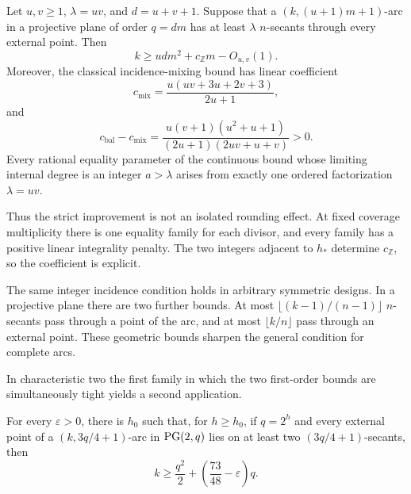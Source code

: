 \begin{theorem}\label{thm:factor-pair}
Let \(u,v\ge1\), \(\lambda=uv\), and \(d=u+v+1\).  Suppose that a
\((k,(u+1)m+1)\)-arc in a projective plane of order \(q=dm\) has at least
\(\lambda\) \(n\)-secants through every external point.  Then
\begin{equation}\label{eq:factor-pair-bound}
 k\ge udm^2+c_{\mathbb Z}m-O_{u,v}(1).
\end{equation}
Moreover, the classical incidence-mixing bound has linear coefficient
\[
 c_{\mathrm{mix}}=\frac{u(uv+3u+2v+3)}{2u+1},
\]
and
\begin{equation}\label{eq:strict-gap}
 c_{\mathrm{bal}}-c_{\mathrm{mix}}
 =\frac{u(v+1)(u^2+u+1)}{(2u+1)(2uv+u+v)}>0.
\end{equation}
Every rational equality parameter of the continuous bound whose limiting
internal degree is an integer \(a>\lambda\) arises from exactly one ordered
factorization \(\lambda=uv\).
\end{theorem}

Thus the strict improvement is not an isolated rounding effect.  At fixed
coverage multiplicity there is one equality family for each divisor, and every
family has a positive linear integrality penalty.  The two integers adjacent
to \(h_*\) determine \(c_{\mathbb Z}\), so the coefficient is explicit.

The same integer incidence condition holds in arbitrary symmetric designs.
In a projective plane there are two further bounds.  At most
\(\lfloor(k-1)/(n-1)\rfloor\) \(n\)-secants pass through a point of the arc,
and at most \(\lfloor k/n\rfloor\) pass through an external point.  These
geometric bounds sharpen the general condition for complete arcs.

In characteristic two the first family in which the two first-order bounds
are simultaneously tight yields a second
application.

\begin{theorem}\label{thm:characteristic-two}
For every \(\varepsilon>0\), there is \(h_0\) such that, for \(h\ge h_0\),
if \(q=2^h\) and every external point of a
\((k,3q/4+1)\)-arc in \(\mathrm{PG}(2,q)\) lies on at least two \((3q/4+1)\)-secants,
then
\begin{equation}\label{eq:characteristic-two-bound}
 k\ge \frac{q^2}{2}+\left(\frac{73}{48}-\varepsilon\right)q.
\end{equation}
\end{theorem}

